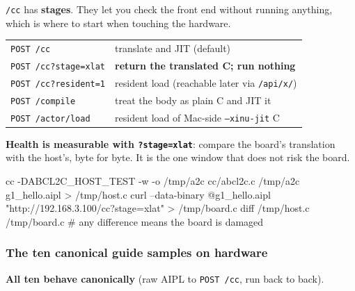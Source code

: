\documentclass[11pt,a4paper]{article}
\begin{document}
\texttt{/cc} has \textbf{stages}. They let you check the front end without
running anything, which is where to start when touching the hardware.

\begin{center}
\small
\begin{tabular}{@{}ll@{}}
\toprule
\texttt{POST /cc} & translate and JIT (default) \\
\texttt{POST /cc?stage=xlat} & \textbf{return the translated C; run nothing} \\
\texttt{POST /cc?resident=1} & resident load (reachable later via \texttt{/api/x/}) \\
\texttt{POST /compile} & treat the body as plain C and JIT it \\
\texttt{POST /actor/load} & resident load of Mac-side \texttt{--xinu-jit} C \\
\bottomrule
\end{tabular}
\end{center}

\textbf{Health is measurable with \texttt{?stage=xlat}}: compare the board's
translation with the host's, byte for byte. It is the one window that does not
risk the board.

\begin{term}
cc -DABCL2C_HOST_TEST -w -o /tmp/a2c cc/abcl2c.c
/tmp/a2c g1_hello.aipl > /tmp/host.c
curl --data-binary @g1_hello.aipl "http://192.168.3.100/cc?stage=xlat" > /tmp/board.c
diff /tmp/host.c /tmp/board.c        # any difference means the board is damaged
\end{term}

\subsubsection*{The ten canonical guide samples on hardware}

\textbf{All ten behave canonically} (raw AIPL to \texttt{POST /cc}, run back to back).
\end{document}
